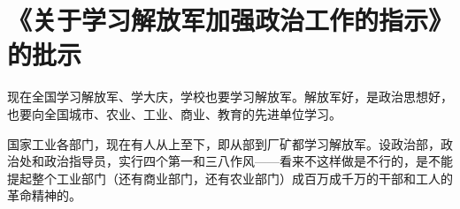 \section[《关于学习解放军加强政治工作的指示》的批示（一九六四年）]{《关于学习解放军加强政治工作的指示》的批示}


现在全国学习解放军、学大庆，学校也要学习解放军。解放军好，是政治思想好，也要向全国城市、农业、工业、商业、教育的先进单位学习。

国家工业各部门，现在有人从上至下，即从部到厂矿都学习解放军。设政治部，政治处和政治指导员，实行四个第一和三八作风——看来不这样做是不行的，是不能提起整个工业部门（还有商业部门，还有农业部门）成百万成千万的干部和工人的革命精神的。

